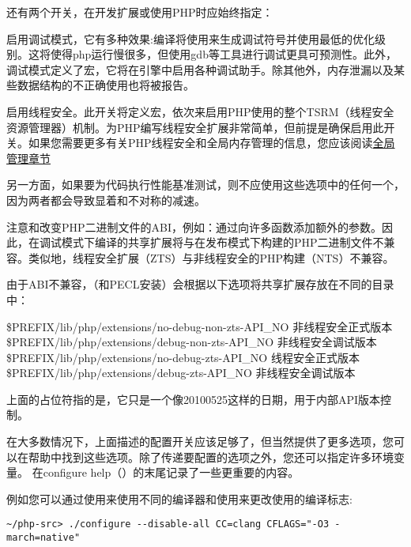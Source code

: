 还有两个开关，在开发扩展或使用PHP时应始终指定：

启用调试模式，它有多种效果:编译将使用来生成调试符号并使用最低的优化级别。这将使得php运行慢很多，但使用gdb等工具进行调试更具可预测性。此外，调试模式定义了宏，它将在引擎中启用各种调试助手。除其他外，内存泄漏以及某些数据结构的不正确使用也将被报告。

启用线程安全。此开关将定义宏，依次来启用PHP使用的整个TSRM（线程安全资源管理器）机制。为PHP编写线程安全扩展非常简单，但前提是确保启用此开关。如果您需要更多有关PHP线程安全和全局内存管理的信息，您应该阅读\href{http://www.phpinternalsbook.com/php7/extensions_design/globals_management.html}{全局管理章节}

另一方面，如果要为代码执行性能基准测试，则不应使用这些选项中的任何一个，因为两者都会导致显着和不对称的减速。

注意和改变PHP二进制文件的ABI，例如：通过向许多函数添加额外的参数。因此，在调试模式下编译的共享扩展将与在发布模式下构建的PHP二进制文件不兼容。类似地，线程安全扩展（ZTS）与非线程安全的PHP构建（NTS）不兼容。

由于ABI不兼容，（和PECL安装）会根据以下选项将共享扩展存放在不同的目录中：

\$PREFIX/lib/php/extensions/no-debug-non-zts-API\_NO    非线程安全正式版本
\$PREFIX/lib/php/extensions/debug-non-zts-API\_NO       非线程安全调试版本
\$PREFIX/lib/php/extensions/no-debug-zts-API\_NO       线程安全正式版本
\$PREFIX/lib/php/extensions/debug-zts-API\_NO          非线程安全调试版本

上面的占位符指的是，它只是一个像20100525这样的日期，用于内部API版本控制。

在大多数情况下，上面描述的配置开关应该足够了，但当然提供了更多选项，您可以在帮助中找到这些选项。除了传递要配置的选项之外，您还可以指定许多环境变量。 在configure help（）的末尾记录了一些更重要的内容。

例如您可以通过使用来使用不同的编译器和使用来更改使用的编译标志:

\begin{lstlisting}[language=shell]
~/php-src> ./configure --disable-all CC=clang CFLAGS="-O3 -march=native"
\end{lstlisting}

